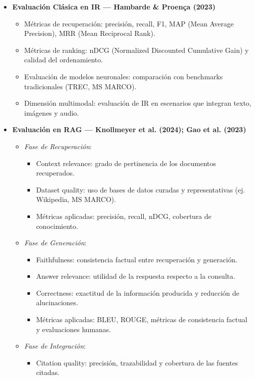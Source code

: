 \begin{itemize}
    \item \textbf{Evaluación Clásica en IR — Hambarde \& Proença (2023)}
    \begin{itemize}
        \item Métricas de recuperación: precisión, recall, F1, MAP (Mean Average Precision), MRR (Mean Reciprocal Rank).
        \item Métricas de ranking: nDCG (Normalized Discounted Cumulative Gain) y calidad del ordenamiento.
        \item Evaluación de modelos neuronales: comparación con benchmarks tradicionales (TREC, MS MARCO).
        \item Dimensión multimodal: evaluación de IR en escenarios que integran texto, imágenes y audio.
    \end{itemize}

    \item \textbf{Evaluación en RAG — Knollmeyer et al. (2024); Gao et al. (2023)}
    \begin{itemize}
        \item \textit{Fase de Recuperación}: 
        \begin{itemize}
            \item Context relevance: grado de pertinencia de los documentos recuperados.
            \item Dataset quality: uso de bases de datos curadas y representativas (ej. Wikipedia, MS MARCO).
            \item Métricas aplicadas: precisión, recall, nDCG, cobertura de conocimiento.
        \end{itemize}

        \item \textit{Fase de Generación}: 
        \begin{itemize}
            \item Faithfulness: consistencia factual entre recuperación y generación.
            \item Answer relevance: utilidad de la respuesta respecto a la consulta.
            \item Correctness: exactitud de la información producida y reducción de alucinaciones.
            \item Métricas aplicadas: BLEU, ROUGE, métricas de consistencia factual y evaluaciones humanas.
        \end{itemize}

        \item \textit{Fase de Integración}: 
        \begin{itemize}
            \item Citation quality: precisión, trazabilidad y cobertura de las fuentes citadas.
        \end{itemize}


\end{itemize}
\end{itemize}

